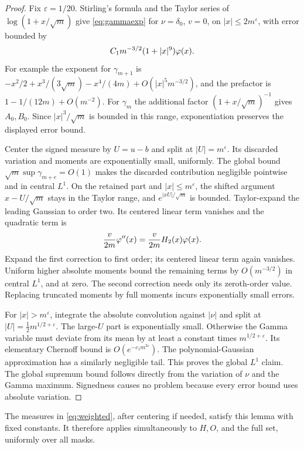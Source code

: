 \documentclass[11pt,a4paper]{article}
\theoremstyle{remark}\newtheorem*{ednote}{Editorial note (ProveIt, 2026-10-01)}
\begin{document}
\begin{proof}
Fix $\varepsilon=1/20$. Stirling's formula and the Taylor series of $\log(1+x/\sqrt m)$ give \eqref{eq:gammaexp} for $\nu=\delta_0$, $v=0$, on $|x|\le2m^\varepsilon$, with error bounded by
\[
 C_1m^{-3/2}(1+|x|^9)\varphi(x).
\]
For example the exponent for $\gamma_{m+1}$ is
$-x^2/2+x^3/(3\sqrt m)-x^4/(4m)+O(|x|^5m^{-3/2})$,
and the prefactor is $1-1/(12m)+O(m^{-2})$. For $\gamma_m$ the additional factor $(1+x/\sqrt m)^{-1}$ gives $A_0,B_0$. Since $|x|^3/\sqrt m$ is bounded in this range, exponentiation preserves the displayed error bound.

Center the signed measure by $U=u-b$ and split at $|U|=m^\varepsilon$. Its discarded variation and moments are exponentially small, uniformly. The global bound $\sqrt m\sup\gamma_{m+e}=O(1)$ makes the discarded contribution negligible pointwise and in central $L^1$. On the retained part and $|x|\le m^\varepsilon$, the shifted argument $x-U/\sqrt m$ stays in the Taylor range, and $e^{|xU|/\sqrt m}$ is bounded. Taylor-expand the leading Gaussian to order two. Its centered linear term vanishes and the quadratic term is
\[
 \frac{v}{2m}\varphi''(x)=\frac{v}{2m}H_2(x)\varphi(x).
\]
Expand the first correction to first order; its centered linear term again vanishes. Uniform higher absolute moments bound the remaining terms by $O(m^{-3/2})$ in central $L^1$, and at zero. The second correction needs only its zeroth-order value. Replacing truncated moments by full moments incurs exponentially small errors.

For $|x|>m^\varepsilon$, integrate the absolute convolution against $|\nu|$ and split at $|U|=\tfrac12m^{1/2+\varepsilon}$. The large-$U$ part is exponentially small. Otherwise the Gamma variable must deviate from its mean by at least a constant times $m^{1/2+\varepsilon}$. Its elementary Chernoff bound is $O(e^{-c_1m^{2\varepsilon}})$. The polynomial-Gaussian approximation has a similarly negligible tail. This proves the global $L^1$ claim. The global supremum bound follows directly from the variation of $\nu$ and the Gamma maximum. Signedness causes no problem because every error bound uses absolute variation.
\end{proof}

The measures in \eqref{eq:weighted}, after centering if needed, satisfy this lemma with fixed constants. It therefore applies simultaneously to $H,O$, and the full set, uniformly over all masks.
\end{document}
